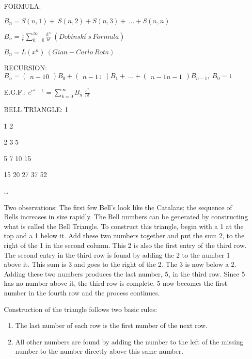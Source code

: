 \documentclass[10pt,letter]{article}
\begin{document}
FORMULA:

\(B_{n} = S\left( n,1 \right) + \ S\left( n,2 \right) + S\left( n,3 \right) + \ \ldots + S(n,n)\)

\(B_{n} = \frac{1}{e}\sum_{k = 0}^{\infty}\frac{k^{n}}{k!}\ (Dobinski^{'}s\ Formula)\)

\(B_{n} = L\left( x^{n} \right)\ (Gian - Carlo\ Rota)\)

RECURSION: \(B_{n} =
\begin{pmatrix}
n - 1
0
\end{pmatrix}
B_{0} +
\begin{pmatrix}
n - 1
1
\end{pmatrix}
B_{1} + \ \ldots +
\begin{pmatrix}
n - 1
n - 1
\end{pmatrix}
B_{n - 1},\ B_{0} = 1\)

E.G.F.:
\(e^{e^{x} - 1} = \sum_{k = 0}^{\infty}{B_{n}\ \frac{x^{n}}{n!}}\)

BELL TRIANGLE: 1

1 2

2 3 5

5 7 10 15

15 20 27 37 52

\ldots{}

Two observations: The first few Bell's look like the Catalans; the
sequence of Bells increases in size rapidly. The Bell numbers can be
generated by constructing what is called the Bell Triangle. To construct
this triangle, begin with a 1 at the top and a 1 below it. Add these two
numbers together and put the sum 2, to the right of the 1 in the second
column. This 2 is also the first entry of the third row. The second
entry in the third row is found by adding the 2 to the number 1 above
it. This sum is 3 and goes to the right of the 2. The 3 is now below a
2. Adding these two numbers produces the last number, 5, in the third
row. Since 5 has no number above it, the third row is complete. 5 now
becomes the first number in the fourth row and the process continues.

Construction of the triangle follows two basic rules:
\begin{enumerate}
\def\labelenumi{\arabic{enumi}.}

\item
  The last number of each row is the first number of the next row.
\item
  All other numbers are found by adding the number to the left of the
  missing number to the number directly above this same number.

\end{enumerate}
\end{document}
